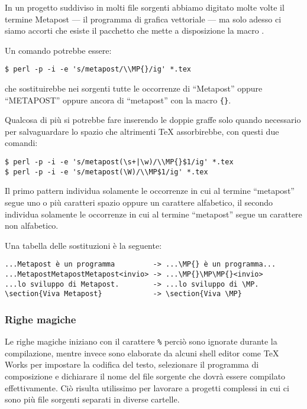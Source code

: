 In un progetto suddiviso in molti file sorgenti abbiamo digitato molte volte il termine Metapost --- il programma di grafica vettoriale --- ma solo adesso ci siamo accorti che esiste il pacchetto  che mette a disposizione la macro .

Un comando potrebbe essere:
\begin{verbatim}
$ perl -p -i -e 's/metapost/\\MP{}/ig' *.tex
\end{verbatim}
che sostituirebbe nei sorgenti tutte le occorrenze di ``Metapost'' oppure ``METAPOST'' oppure ancora di ``metapost'' con la macro \texttt{\{\}}.

Qualcosa di più si potrebbe fare inserendo le doppie graffe solo quando necessario per salvaguardare lo spazio che altrimenti \TeX{} assorbirebbe, con questi due comandi:
\begin{verbatim}
$ perl -p -i -e 's/metapost(\s+|\w)/\\MP{}$1/ig' *.tex
$ perl -p -i -e 's/metapost(\W)/\\MP$1/ig' *.tex
\end{verbatim}

Il primo pattern individua solamente le occorrenze in cui al termine ``metapost'' segue uno o più caratteri spazio oppure un carattere alfabetico, il secondo individua solamente le occorrenze in cui al termine ``metapost'' segue un carattere non alfabetico.

Una tabella delle sostituzioni è la seguente:
\begin{Verbatim}[fontsize=\small]
...Metapost è un programma         -> ...\MP{} è un programma...
...MetapostMetapostMetapost<invio> -> ...\MP{}\MP\MP{}<invio>
...lo sviluppo di Metapost.        -> ...lo sviluppo di \MP.
\section{Viva Metapost}            -> \section{Viva \MP}
\end{Verbatim}

\subsubsection{Righe magiche}

Le righe magiche iniziano con il carattere \texttt{\%} perciò sono ignorate durante la compilazione, mentre invece sono elaborate da alcuni shell editor come TeX Works per impostare la codifica del testo, selezionare il programma di composizione e dichiarare il nome del file sorgente che dovrà essere compilato effettivamente. Ciò risulta utilissimo per lavorare a progetti complessi in cui ci sono più file sorgenti separati in diverse cartelle.

